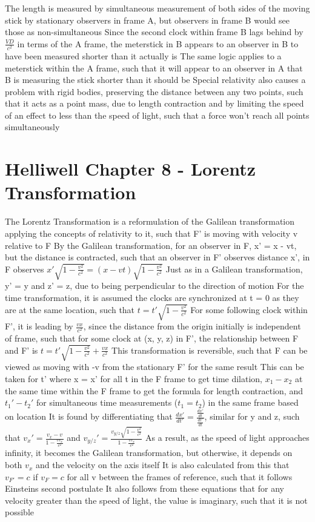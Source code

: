 \documentclass[11 pt, twoside]{article}
\newenvironment{outline*}
{
	\begin{outline}[enumerate]
	}
	{\end{outline}
}
\begin{document}
\begin{outline*}
\2 The length is measured by simultaneous measurement of both sides of the moving stick by stationary observers in frame A, but observers in frame B would see those as non-simultaneous
\2 Since the second clock within frame B lags behind by $\frac{VD}{c^2}$ in terms of the A frame, the meterstick in B appears to an observer in B to have been measured shorter than it actually is
\3 The same logic applies to a meterstick within the A frame, such that it will appear to an observer in A that B is measuring the stick shorter than it should be
\1 Special relativity also causes a problem with rigid bodies, preserving the distance between any two points, such that it acts as a point mass, due to length contraction and by limiting the speed of an effect to less than the speed of light, such that a force won't reach all points simultaneously
\end{outline*}
\section{Helliwell Chapter 8 - Lorentz Transformation}
\begin{outline*}
\1 The Lorentz Transformation is a reformulation of the Galilean transformation applying the concepts of relativity to it, such that F' is moving with velocity v relative to F
\2 By the Galilean transformation, for an observer in F, x' = x - vt, but the distance is contracted, such that an observer in F' observes distance x', in F observes $x'\sqrt{1 - \frac{v^2}{c^2}} = (x - vt)\sqrt{1 - \frac{v^2}{c^2}}$
\2 Just as in a Galilean transformation, y' = y and z' = z, due to being perpendicular to the direction of motion
\2 For the time transformation, it is assumed the clocks are synchronized at t = 0 as they are at the same location, such that $t = t'\sqrt{1 - \frac{v^2}{c^2}}$ 
\3 For some following clock within F', it is leading by $\frac{vx}{c^2}$, since the distance from the origin initially is independent of frame, such that for some clock at (x, y, z) in F', the relationship between F and F' is $t = t'\sqrt{1 - \frac{v^2}{c^2}} + \frac{vx}{c^2}$
\2 This transformation is reversible, such that F can be viewed as moving with -v from the stationary F' for the same result
\1 This can be taken for t' where x = x' for all t in the F frame to get time dilation, $x_1 - x_2$ at the same time within the F frame to get the formula for length contraction, and $t_1' - t_2'$ for simultaneous time measurements ($t_1 = t_2$) in the same frame based on location
\1 It is found by differentiating that $\frac{dx'}{dt'} = \frac{\frac{dx'}{dt}}{\frac{dt'}{dt}}$, similar for y and z, such that $v_x' = \frac{v_x - v}{1 - \frac{vv_x}{c^2}}$ and $v_{y/z}' = \frac{v_{y/z}\sqrt{1 - \frac{v^2}{c^2}}}{1 - \frac{vv_x}{c^2}}$
\2 As a result, as the speed of light approaches infinity, it becomes the Galilean transformation, but otherwise, it depends on both $v_x$ and the velocity on the axis itself
\2 It is also calculated from this that $v_{F'} = c$ if $v_F = c$ for all v between the frames of reference, such that it follows Einsteins second postulate
\2 It also follows from these equations that for any velocity greater than the speed of light, the value is imaginary, such that it is not possible
\end{outline*}
\end{document}

